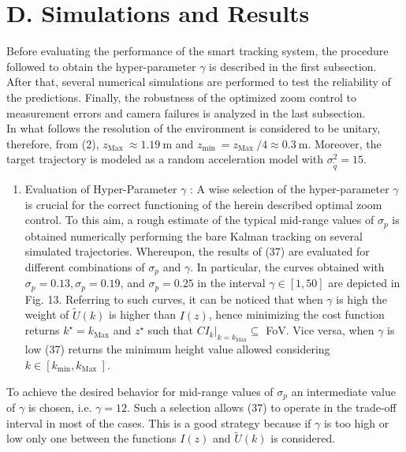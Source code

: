 \documentclass[conference]{IEEEtran}
\begin{document}
\section*{D. Simulations and Results}
Before evaluating the performance of the smart tracking system, the procedure followed to obtain the hyper-parameter $\gamma$ is described in the first subsection. After that, several numerical simulations are performed to test the reliability of the predictions. Finally, the robustness of the optimized zoom control to measurement errors and camera failures is analyzed in the last subsection.\\
In what follows the resolution of the environment is considered to be unitary, therefore, from (2), $z_{\text {Max }} \approx 1.19 \mathrm{~m}$ and $z_{\text {min }}=z_{\text {Max }} / 4 \approx 0.3 \mathrm{~m}$. Moreover, the target trajectory is modeled as a random acceleration model with $\sigma_{\tilde{q}}^{2}=15$.

\begin{enumerate}
  \item Evaluation of Hyper-Parameter $\gamma$ : A wise selection of the hyper-parameter $\gamma$ is crucial for the correct functioning of the herein described optimal zoom control. To this aim, a rough estimate of the typical mid-range values of $\sigma_{p}$ is obtained numerically performing the bare Kalman tracking on several simulated trajectories. Whereupon, the results of (37) are evaluated for different combinations of $\sigma_{p}$ and $\gamma$. In particular, the curves obtained with $\sigma_{p}=0.13, \sigma_{p}=0.19$, and $\sigma_{p}=0.25$ in the interval $\gamma \in[1,50]$ are depicted in Fig. 13. Referring to such curves, it can be noticed that when $\gamma$ is high the weight of $\tilde{U}(k)$ is higher than $I(z)$, hence minimizing the cost function returns $k^{\star}=k_{\operatorname{Max}}$ and $z^{\star}$ such that $\left.C I_{k}\right|_{k=k_{\operatorname{Max}}} \subseteq$ FoV. Vice versa, when $\gamma$ is low (37) returns the minimum height value allowed considering $k \in\left[k_{\min }, k_{\text {Max }}\right]$.
\end{enumerate}

To achieve the desired behavior for mid-range values of $\sigma_{p}$ an intermediate value of $\gamma$ is chosen, i.e. $\gamma=12$. Such a selection allows (37) to operate in the trade-off interval in most of the cases. This is a good strategy because if $\gamma$ is too high or low only one between the functions $I(z)$ and $\tilde{U}(k)$ is considered.
\end{document}
